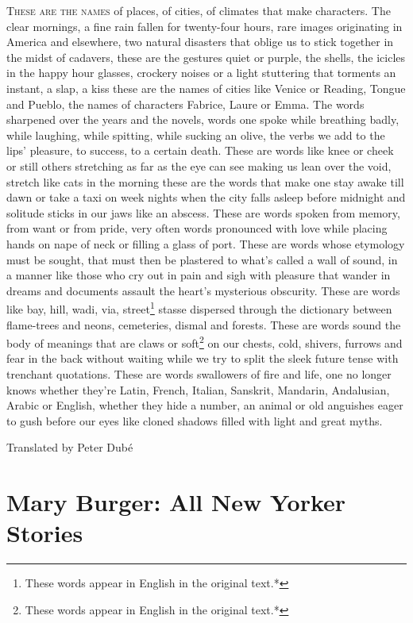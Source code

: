 \documentclass[
]{memoir}
\begin{document}
\lettrine[lines=3, findent=0em, nindent=0.1em, lhang=0]{T}{hese are the names}
of places, of cities, of climates that make characters. The clear
mornings, a fine rain fallen for twenty-four hours, rare images
originating in America and elsewhere, two natural disasters that oblige
us to stick together in the midst of cadavers, these are the gestures
quiet or purple, the shells, the icicles in the happy hour glasses,
crockery noises or a light stuttering that torments an instant, a slap,
a kiss these are the names of cities like Venice or Reading, Tongue and
Pueblo, the names of characters Fabrice, Laure or Emma. The words
sharpened over the years and the novels, words one spoke while breathing
badly, while laughing, while spitting, while sucking an olive, the verbs
we add to the lips' pleasure, to success, to a certain death. These are
words like knee or cheek or still others stretching as far as the eye
can see making us lean over the void, stretch like cats in the morning
these are the words that make one stay awake till dawn or take a taxi on
week nights when the city falls asleep before midnight and solitude
sticks in our jaws like an abscess. These are words spoken from memory,
from want or from pride, very often words pronounced with love while
placing hands on nape of neck or filling a glass of port. These are
words whose etymology must be sought, that must then be plastered to
what's called a wall of sound, in a manner like those who cry out in
pain and sigh with pleasure that wander in dreams and documents assault
the heart's mysterious obscurity. These are words like bay, hill, wadi,
via, street\footnote{These words appear in English in the original
  text.*} stasse dispersed through the dictionary between flame-trees
and neons, cemeteries, dismal and forests. These are words sound the
body of meanings that are claws or soft\footnote{These words appear in
  English in the original text.*} on our chests, cold, shivers, furrows
and fear in the back without waiting while we try to split the sleek
future tense with trenchant quotations. These are words swallowers of
fire and life, one no longer knows whether they're Latin, French,
Italian, Sanskrit, Mandarin, Andalusian, Arabic or English, whether they
hide a number, an animal or old anguishes eager to gush before our eyes
like cloned shadows filled with light and great myths.

Translated by Peter Dubé

\hypertarget{mary-burger-all-new-yorker-stories}{%
\chapter{Mary Burger: All New Yorker
Stories}\label{mary-burger-all-new-yorker-stories}}
\end{document}
